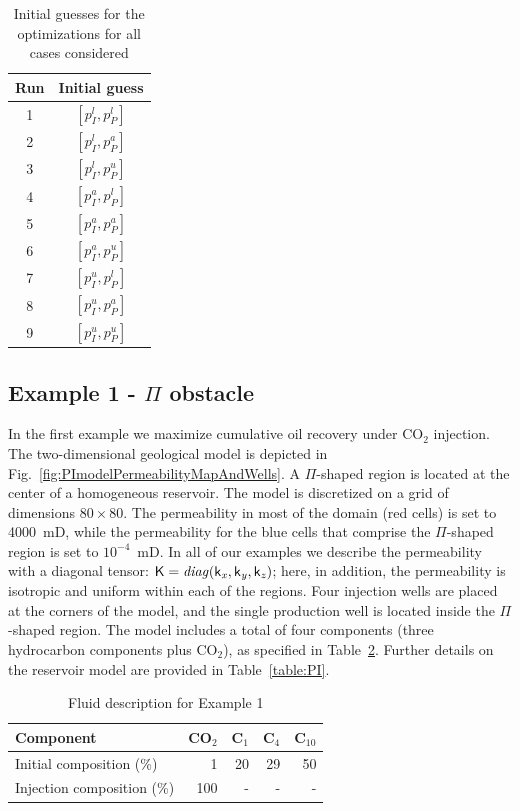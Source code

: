 \documentclass[twocolumn,numbook]{svjour3}          %
\begin{document}
\begin{table}
\centering
\caption{Initial guesses for the optimizations for all
         cases considered}
\begin{tabular}{|c|c|}
\hline
Run & Initial guess    \\
\hline
1 & $[p_I^l, p_P^l]$ \\
2 & $[p_I^l, p_P^a]$ \\
3 & $[p_I^l, p_P^u]$ \\
4 & $[p_I^a, p_P^l]$ \\
5 & $[p_I^a, p_P^a]$ \\
6 & $[p_I^a, p_P^u]$ \\
7 & $[p_I^u, p_P^l]$ \\
8 & $[p_I^u, p_P^a]$ \\
9 & $[p_I^u, p_P^u]$ \\
\hline
\end{tabular}
  \label{table:InitialGuesses}
\end{table}





\subsection{Example 1 - $\Pi$ obstacle}

In the first example we maximize cumulative oil recovery under CO$_2$ injection. The two-dimensional geological model is depicted in Fig.~\ref{fig:PImodelPermeabilityMapAndWells}. A $\Pi$-shaped region is located at the center of a homogeneous reservoir. The model is discretized on a grid of dimensions $80\times80$. The permeability in most of the domain (red cells) is set to 4000~mD, while the permeability for the blue cells that comprise the $\Pi$-shaped region is set to $10^{-4}$~mD. In all of our examples we describe the permeability with a diagonal tensor: $\mathsf{K} = \it{diag}(\mathsf{k}_x, \mathsf{k}_y, \mathsf{k}_z)$; here, in addition, the permeability is isotropic and uniform within each of the regions. Four injection wells are placed at the corners of the model, and the single production well is located inside the $\Pi$-shaped region. The model includes a total of four components (three hydrocarbon  components plus CO$_2$), as specified in Table~\ref{table:fluidForPImodel}. Further details on the reservoir model are provided in Table~\ref{table:PI}.

%
\begin{table}
\centering
\caption{Fluid description for Example 1}
\begin{tabular}{|l|r|r|r|r|}
\hline
Component            & CO$_2$ & C$_1$ & C$_4$ & C$_{10}$    \\
\hline
Initial composition (\%)  & 1    & 20  & 29    & 50 \\
Injection composition (\%)& 100   & - & - & - \\
\hline
\end{tabular}
\label{table:fluidForPImodel}
\end{table}
%
\end{document}
